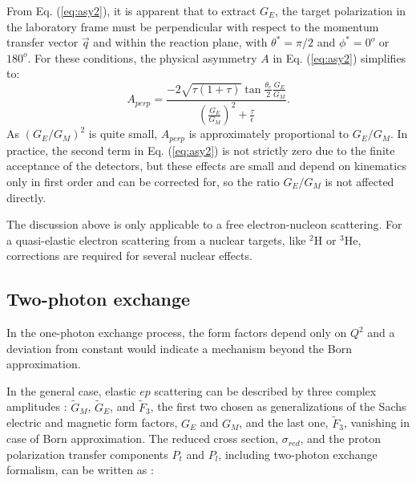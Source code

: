 From Eq. (\ref{eq:asy2}), it is apparent that to extract $G_{E}$, the target polarization 
in the laboratory frame must be perpendicular with respect to the momentum transfer vector ${\vec q}$
and within the reaction plane, with $\theta^{\ast}= \pi/2$ and $\phi^{\ast}= 0^o$ or $180^o$. 
For these conditions, the physical asymmetry $A$ in Eq. (\ref{eq:asy2}) simplifies to:
\begin{equation}
A_{perp}=\frac{-2\sqrt{\tau(1+\tau)}\tan\frac{\theta_e}{2} \frac{G_E}{G_M}}{(\frac{G_E}{G_M})^2+\frac{\tau}{\epsilon}}.
\label{eq:asy3}
\end{equation}
\noindent
As $(G_E/G_M)^2$ is quite small, $A_{perp}$ is approximately proportional to $G_E/G_M$. In practice, the second term in 
Eq. (\ref{eq:asy2}) is not strictly zero due to the finite acceptance of the detectors, but these effects are small and depend
on kinematics only in first order and can be corrected for, so the ratio $G_E/G_M$ is not affected directly.

The discussion above is only applicable to a free electron-nucleon scattering. 
For a quasi-elastic electron scattering from a nuclear targets, like $^2$H or $^3$He, corrections are required for several nuclear effects. 

\subsection{Two-photon exchange}

In the one-photon exchange process, the form factors depend only on $Q^2$
and a deviation from constant would indicate a mechanism beyond
the Born approximation. 

In the general case, 
elastic $ep$ scattering can be described by three
complex amplitudes \cite{diehl:2013,guichon}:  $\tilde{G}_M$, $\tilde{G}_E$,
and $\tilde{F}_3$, the first two 
chosen as generalizations of the Sachs 
electric and magnetic form factors, $G_E$ and $G_M$, and the 
last one, $\tilde{F}_3$, vanishing in case of Born approximation.
The reduced cross section, $\sigma _{red}$, and the
proton polarization transfer components $P_t$ and $P_l$,
including two-photon exchange formalism, can be written as \cite{guichon}:

